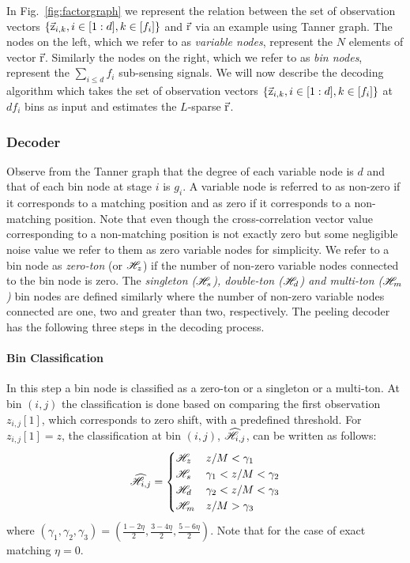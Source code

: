 In Fig.~\ref{fig:factorgraph} we represent the relation between the set of observation vectors $\{\vec{\mathrm{z}}_{i,k},i\in[1:d],k\in[f_i]\}$ and $\vec{\mathrm{r}}$ via an example using Tanner graph. The nodes on the left, which we refer to as {\it variable nodes}, represent the $N$ elements of vector $\vec{\mathrm{r}}$. Similarly the nodes on the right, which we refer to as {\it bin nodes}, represent the $\sum_{i\leq d} f_i$ sub-sensing signals. We will now describe the decoding algorithm which takes the set of observation vectors $\{\vec{\mathrm{z}}_{i,k},i\in[1:d],k\in[f_i]\}$ at $df_i$ bins as input and estimates the $L$-sparse $\vec{\mathrm{r}}$.	

\subsubsection{Decoder}		
	Observe from the Tanner graph that the degree of each variable node is $d$ and that of each bin node at stage $i$ is $g_i$. A variable node is referred to as non-zero if it corresponds to a matching position and as zero if it corresponds to a non-matching position. Note that even though the cross-correlation vector value corresponding to a non-matching position is not exactly zero but some negligible noise value we refer to them as zero variable nodes for simplicity. We refer to a bin node as {\it zero-ton} (or $\mathscr{H}_z$) if the number of non-zero variable nodes connected to the bin node is zero. The {\it singleton ($\mathscr{H}_s$), double-ton ($\mathscr{H}_d$) and multi-ton ($\mathscr{H}_m$)} bin nodes are defined similarly where the number of non-zero variable nodes connected are one, two and greater than two, respectively. The peeling decoder has the following three steps in the decoding process.

\paragraph*{Bin Classification} In this step a bin node is classified as a zero-ton or a singleton or a multi-ton. At bin $(i,j)$ the classification is done based on  comparing the first observation $z_{i,j}[1]$, which corresponds to zero shift, with a predefined threshold. For $z_{i,j}[1]=z$, the classification at bin $(i,j)$, $\widehat{\mathscr{H}}_{i,j}$, can be written as follows:
\begin{align}
\label{Eqn:BinClassifApprox}
\widehat{\mathscr{H}}_{i,j}=
\begin{cases}
\mathscr{H}_z &  	 z/M < \gamma_1\\
\mathscr{H}_s &	  \gamma_1 < z/M < \gamma_2  \\
\mathscr{H}_d  &    \gamma_2  < z/M <  \gamma_3\\
\mathscr{H}_m &      z/M > \gamma_3\\
\end{cases}
\end{align}
where $(\gamma_1,\gamma_2,\gamma_3)=(\frac{1-2\eta}{2},\frac{3-4\eta}{2},\frac{5-6\eta}{2})$. Note that for the case of exact matching $\eta=0$.
